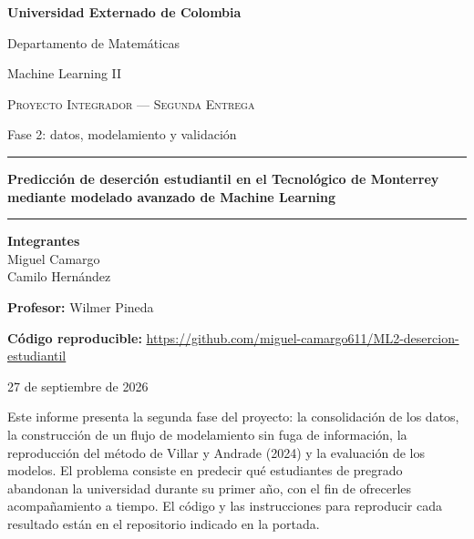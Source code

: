 \documentclass[11pt,a4paper]{article}
\newcommand{\tituloProyecto}{Predicción de deserción estudiantil en el Tecnológico de Monterrey mediante modelado avanzado de Machine Learning}
\newcommand{\nombreCurso}{Machine Learning II}
\newcommand{\nombreProfesor}{Wilmer Pineda}
\newcommand{\repo}{\url{https://github.com/miguel-camargo611/ML2-desercion-estudiantil}}
\begin{document}
\begin{titlepage}
\centering
\vspace*{1.5cm}
{\Large\bfseries Universidad Externado de Colombia\par}
\vspace{0.2cm}
{\large Departamento de Matemáticas\par}
\vspace{0.15cm}
{\large \nombreCurso\par}
\vspace{2.2cm}

{\large\scshape Proyecto Integrador --- Segunda Entrega\par}
\vspace{0.2cm}
{\normalsize Fase 2: datos, modelamiento y validación\par}
\vspace{0.4cm}
\rule{0.6\linewidth}{0.4pt}
\vspace{0.6cm}

{\Huge\bfseries \tituloProyecto \par}
\vspace{0.6cm}
\rule{0.6\linewidth}{0.4pt}

\vfill

\begin{minipage}{0.75\linewidth}
\centering
\textbf{Integrantes}\\[0.3cm]
Miguel Camargo \\
Camilo Hernández
\end{minipage}

\vspace{1.2cm}
\textbf{Profesor:} \nombreProfesor

\vspace{0.8cm}
\textbf{Código reproducible:} \repo

\vspace{1.2cm}
{\large 27 de septiembre de 2026 \par}
\vfill
\end{titlepage}

\setcounter{page}{1}

Este informe presenta la segunda fase del proyecto: la consolidación de los datos, la construcción de un flujo de modelamiento sin fuga de información, la reproducción del método de Villar y Andrade (2024) y la evaluación de los modelos. El problema consiste en predecir qué estudiantes de pregrado abandonan la universidad durante su primer año, con el fin de ofrecerles acompañamiento a tiempo. El código y las instrucciones para reproducir cada resultado están en el repositorio indicado en la portada.
\end{document}
